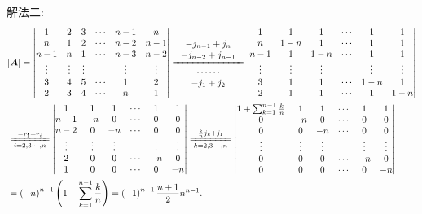 \documentclass[../../main.tex]{subfiles}%
\begin{document}
\begin{solution}
{\color{blue}解法二:}
\begin{align*}
&|\boldsymbol{A}|=\left| \begin{matrix}
1&		2&		3&		\cdots&		n-1&		n\\
n&		1&		2&		\cdots&		n-2&		n-1\\
n-1&		n&		1&		\cdots&		n-3&		n-2\\
\vdots&		\vdots&		\vdots&		&		\vdots&		\vdots\\
3&		4&		5&		\cdots&		1&		2\\
2&		3&		4&		\cdots&		n&		1\\
\end{matrix} \right|\xlongequal[\begin{array}{c}
\cdots \cdots\\
-j_1+j_2\\
\end{array}]{\begin{array}{c}
-j_{n-1}+j_n\\
-j_{n-2}+j_{n-1}\\
\end{array}}\left| \begin{matrix}
1&		1&		1&		\cdots&		1&		1\\
n&		1-n&		1&		\cdots&		1&		1\\
n-1&		1&		1-n&		\cdots&		1&		1\\
\vdots&		\vdots&		\vdots&		&		\vdots&		\vdots\\
3&		1&		1&		\cdots&		1-n&		1\\
2&		1&		1&		\cdots&		1&		1-n\\
\end{matrix} \right|
\\
&\xlongequal[i=2,3\cdots ,n]{-r_1+r_i}\left| \begin{matrix}
1&		1&		1&		\cdots&		1&		1\\
n-1&		-n&		0&		\cdots&		0&		0\\
n-2&		0&		-n&		\cdots&		0&		0\\
\vdots&		\vdots&		\vdots&		&		\vdots&		\vdots\\
2&		0&		0&		\cdots&		-n&		0\\
1&		0&		0&		\cdots&		0&		-n\\
\end{matrix} \right|\xlongequal[k=2,3\cdots ,n]{\frac{k}{n}j_k+j_1}\left| \begin{matrix}
1+\sum_{k=1}^{n-1}{\frac{k}{n}}&		1&		1&		\cdots&		1&		1\\
0&		-n&		0&		\cdots&		0&		0\\
0&		0&		-n&		\cdots&		0&		0\\
\vdots&		\vdots&		\vdots&		&		\vdots&		\vdots\\
0&		0&		0&		\cdots&		-n&		0\\
0&		0&		0&		\cdots&		0&		-n\\
\end{matrix} \right|
\\
&=\left( -n \right) ^{n-1}\left( 1+\sum_{k=1}^{n-1}{\frac{k}{n}} \right) =\left( -1 \right) ^{n-1}\frac{n+1}{2}n^{n-1}.
\end{align*}

\end{solution}
\end{document}
